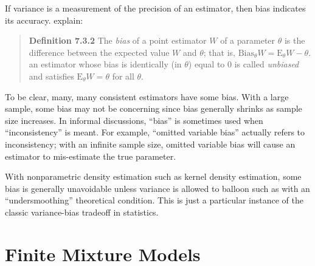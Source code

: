 \documentclass[english]{article}
\begin{document}
If variance is a measurement of the precision of an estimator, then
bias indicates its accuracy. \cite{CasellaBerger2002} explain:
\begin{quote}
\textbf{Definition 7.3.2} The \textit{bias} of a point estimator $W$
of a parameter $\theta$ is the difference between the expected value
$W$ and $\theta$; that is, $\mathrm{Bias}_{\theta}W=\mathrm{E}_{\theta}W-\theta$.
an estimator whose bias is identically (in $\theta$) equal to 0 is
called \textit{unbiased} and satisfies $\mathrm{E}_{\theta}W=\theta$
for all $\theta$.
\end{quote}
To be clear, many, many consistent estimators have some bias. With
a large sample, some bias may not be concerning since bias generally
shrinks as sample size increases. In informal discussions, ``bias''
is sometimes used when ``inconsistency'' is meant. For example,
``omitted variable bias'' actually refers to inconsistency; with
an infinite sample size, omitted variable bias will cause an estimator
to mis-estimate the true parameter. 

With nonparametric density estimation such as kernel density estimation,
some bias is generally unavoidable unless variance is allowed to balloon
such as with an ``undersmoothing'' theoretical condition. This is
just a particular instance of the classic variance-bias tradeoff in
statistics.

\section{Finite Mixture Models\label{sec:Finite-Mixture-Models}}
\end{document}
